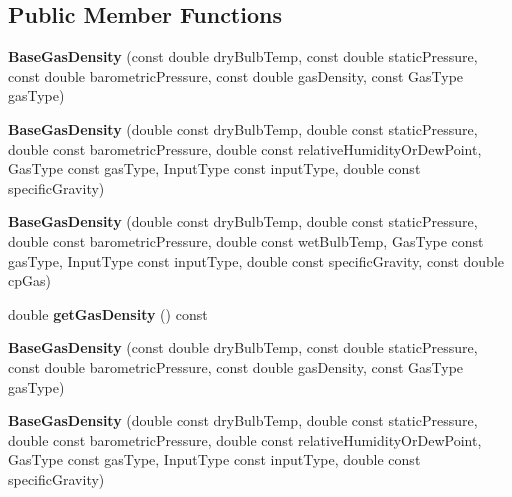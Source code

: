 \subsection*{Public Member Functions}
\begin{DoxyCompactItemize}
\item 
\mbox{\label{class_base_gas_density_a84089ddd9d29649d83a7b150b711b989}} 
{\bfseries Base\+Gas\+Density} (const double dry\+Bulb\+Temp, const double static\+Pressure, const double barometric\+Pressure, const double gas\+Density, const Gas\+Type gas\+Type)
\item 
\mbox{\label{class_base_gas_density_a0d53c40eecc4aad87c8fef1cfed1b614}} 
{\bfseries Base\+Gas\+Density} (double const dry\+Bulb\+Temp, double const static\+Pressure, double const barometric\+Pressure, double const relative\+Humidity\+Or\+Dew\+Point, Gas\+Type const gas\+Type, Input\+Type const input\+Type, double const specific\+Gravity)
\item 
\mbox{\label{class_base_gas_density_a08fc6e441bfec806ea73a9e37be60d92}} 
{\bfseries Base\+Gas\+Density} (double const dry\+Bulb\+Temp, double const static\+Pressure, double const barometric\+Pressure, double const wet\+Bulb\+Temp, Gas\+Type const gas\+Type, Input\+Type const input\+Type, double const specific\+Gravity, const double cp\+Gas)
\item 
\mbox{\label{class_base_gas_density_a1cbf2591aecb384afd5843f0e4a62a4e}} 
double {\bfseries get\+Gas\+Density} () const
\item 
\mbox{\label{class_base_gas_density_a84089ddd9d29649d83a7b150b711b989}} 
{\bfseries Base\+Gas\+Density} (const double dry\+Bulb\+Temp, const double static\+Pressure, const double barometric\+Pressure, const double gas\+Density, const Gas\+Type gas\+Type)
\item 
\mbox{\label{class_base_gas_density_a0d53c40eecc4aad87c8fef1cfed1b614}} 
{\bfseries Base\+Gas\+Density} (double const dry\+Bulb\+Temp, double const static\+Pressure, double const barometric\+Pressure, double const relative\+Humidity\+Or\+Dew\+Point, Gas\+Type const gas\+Type, Input\+Type const input\+Type, double const specific\+Gravity)

\end{DoxyCompactItemize}
